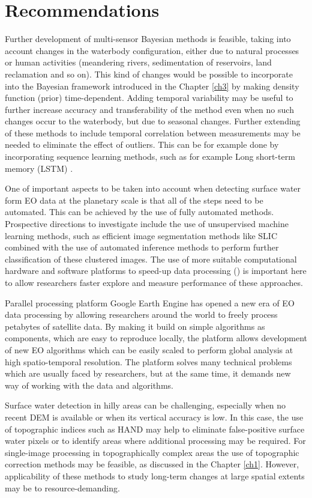 \section{Recommendations}

Further development of multi-sensor Bayesian methods is feasible, taking into account changes in the waterbody configuration, either due to natural processes or human activities (meandering rivers, sedimentation of reservoirs, land reclamation and so on). This kind of changes would be possible to incorporate into the Bayesian framework introduced in the Chapter \ref{ch3} by making density function (prior) time-dependent. Adding temporal variability may be useful to further increase accuracy and transferability of the method even when no such changes occur to the waterbody, but due to seasonal changes. Further extending of these methods to include temporal correlation between measurements may be needed to eliminate the effect of outliers. This can be for example done by incorporating sequence learning methods, such as for example Long short-term memory (LSTM) \citep{hochreiter1997long}.

One of important aspects to be taken into account when detecting surface water form EO data at the planetary scale is that all of the steps need to be automated. This can be achieved by the use of fully automated methods. Prospective directions to investigate include the use of unsupervised machine learning methods, such as efficient image segmentation methods like SLIC \citep{achanta2012slic} combined with the use of automated inference methods to perform further classification of these clustered images. The use of more suitable computational hardware and software platforms to speed-up data processing (\citep{donchyts2017slic}) is important here to allow researchers faster explore and measure performance of these approaches.

Parallel processing platform Google Earth Engine has opened a new era of EO data processing by allowing researchers around the world to freely process petabytes of satellite data. By making it build on simple algorithms as components, which are easy to reproduce locally, the platform allows development of new EO algorithms which can be easily scaled to perform global analysis at high spatio-temporal resolution. The platform solves many technical problems which are usually faced by researchers, but at the same time, it demands new way of working with the data and algorithms.

Surface water detection in hilly areas can be challenging, especially when no recent DEM is available or when its vertical accuracy is low. In this case, the use of topographic indices such as HAND \citep{Nobre2011} may help to eliminate false-positive surface water pixels or to identify areas where additional processing may be required. For single-image processing in topographically complex areas the use of topographic correction methods may be feasible, as discussed in the Chapter \ref{ch1}. However, applicability of these methods to study long-term changes at large spatial extents may be to resource-demanding.

